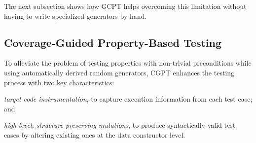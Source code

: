 \documentclass[sigconf,review,anonymous]{acmart}
\newcommand{\fuzzchick}{\textit{FuzzChick}\xspace}
\begin{document}
The next subsection shows how GCPT helps overcoming this limitation without
having to write specialized generators by hand.




\subsection{Coverage-Guided Property-Based Testing}

To alleviate the problem of testing properties with non-trivial preconditions
while using automatically derived random generators, CGPT
%
%
enhances the testing process with two key characteristics:
%
\begin{inparaenum}
\item \emph{target code instrumentation}, to capture execution information from
  each test case; and
\item \emph{high-level, structure-preserving mutations}, to produce
  syntactically valid test cases by altering existing ones at the data
  constructor level.
\end{inparaenum}
\end{document}
